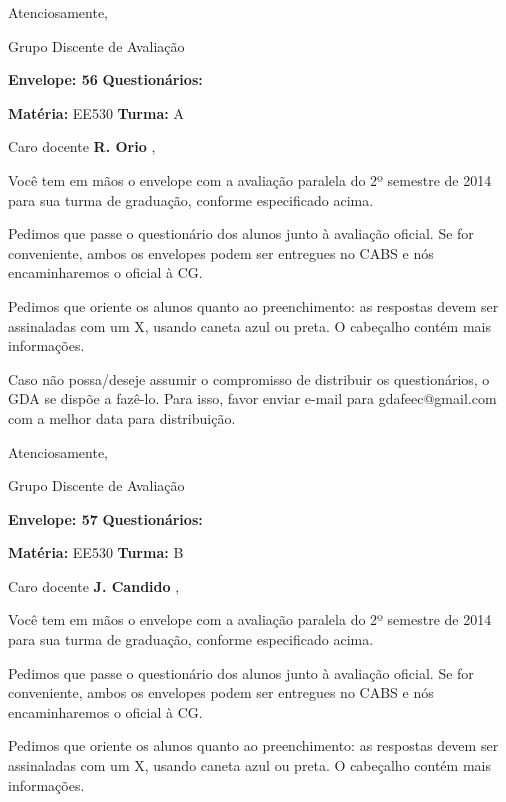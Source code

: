 \documentclass[a5paper]{letter}
\begin{document}
Atenciosamente, 

Grupo Discente de Avaliação

\vspace{0.5cm}

{\bf Envelope: 56 }		\hfill	{\bf Questionários:} \hspace{2cm}

\newpage
\thispagestyle{empty}

\hfill {\bf Matéria:} EE530 {\bf Turma:} A

Caro docente {\bf R. Orio }, 

	Você tem em mãos o envelope com a avaliação paralela do 2º semestre de 2014 para sua turma de graduação, conforme especificado acima.

	Pedimos que passe o questionário dos alunos junto à avaliação oficial. Se for conveniente, ambos os envelopes podem ser entregues no CABS e nós encaminharemos o oficial à CG.

Pedimos que oriente os alunos quanto ao preenchimento: as respostas devem ser assinaladas com um X, usando caneta azul ou preta. O cabeçalho contém mais informações.

	Caso não possa/deseje assumir o compromisso de distribuir os questionários, o GDA se dispõe a fazê-lo. Para isso, favor enviar e-mail para gdafeec@gmail.com com a melhor data para distribuição.


Atenciosamente, 

Grupo Discente de Avaliação

\vspace{0.5cm}

{\bf Envelope: 57 }		\hfill	{\bf Questionários:} \hspace{2cm}

\newpage
\thispagestyle{empty}

\hfill {\bf Matéria:} EE530 {\bf Turma:} B

Caro docente {\bf J. Candido }, 

	Você tem em mãos o envelope com a avaliação paralela do 2º semestre de 2014 para sua turma de graduação, conforme especificado acima.

	Pedimos que passe o questionário dos alunos junto à avaliação oficial. Se for conveniente, ambos os envelopes podem ser entregues no CABS e nós encaminharemos o oficial à CG.

Pedimos que oriente os alunos quanto ao preenchimento: as respostas devem ser assinaladas com um X, usando caneta azul ou preta. O cabeçalho contém mais informações.
\end{document}
